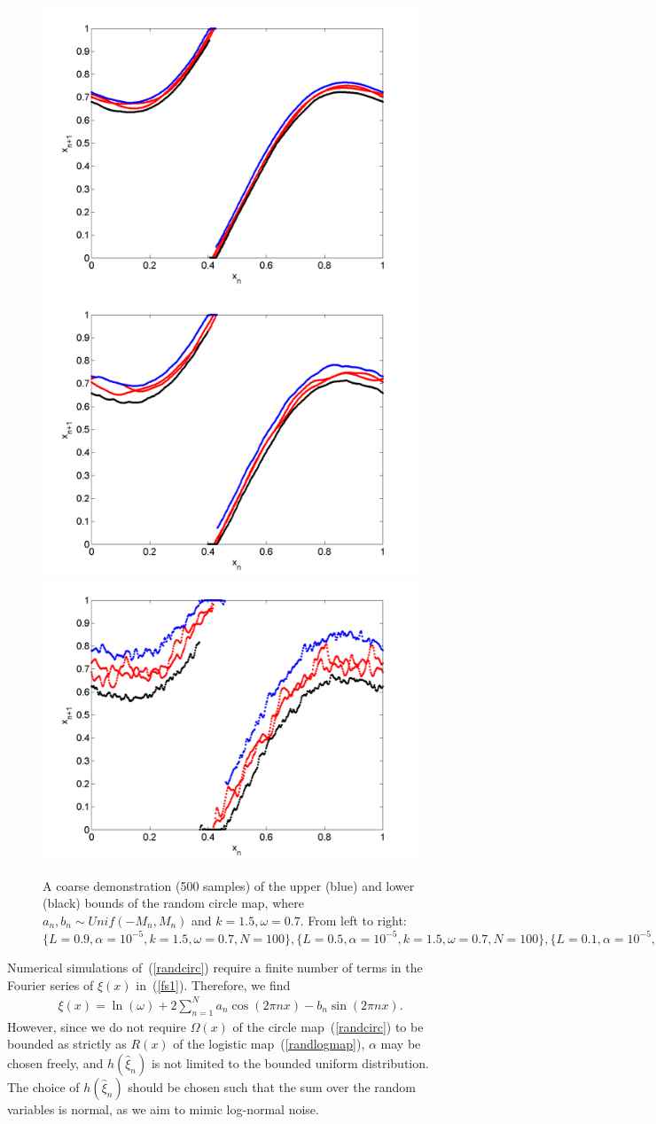 \begin{figure}[htp]
\caption[Upper and lower bounds on the random circle map, Uniform
distribution for $k=1.5,\omega=0.7$]{A coarse
  demonstration (500 samples) of the upper (blue) and lower (black)
  bounds of the random circle map, where $a_n,b_n\sim Unif(-M_n,M_n)$
  and $k=1.5,\omega=0.7$. From left to right:
  $\{L=0.9,\alpha = 10^{-5},k=1.5,\omega=0.7,N=100\}, \{L=0.5,\alpha = 10^{-5},k=1.5,\omega=0.7,N=100\},\{L=0.1,\alpha = 10^{-5},k=1.5,\omega=0.7,N=100\},$
  }\label{fig:circ_u_envelope3}
\centering
\includegraphics[width=.3\textwidth]{figs/envelope_unif_500_k15_L09_w07.png}\hfill
\includegraphics[width=.3\textwidth]{figs/envelope_unif_500_k15_L05_w07.png}\hfill
\includegraphics[width=.3\textwidth]{figs/envelope_unif_500_k15_L01_w07.png}
\end{figure}

Numerical simulations of~(\ref{randcirc}) require a finite number of
terms in the Fourier series of $\xi(x)$ in~(\ref{fs1}). Therefore, we find
\begin{align}\label{fs_circ}
\xi(x) = \ln(\omega) + 2\sum^N_{n=1}a_n\cos(2\pi nx)-b_n\sin(2\pi nx).
\end{align}
However, since we
do not require $\Omega(x)$ of the circle map~(\ref{randcirc}) to be bounded as strictly
as $R(x)$ of the logistic map~(\ref{randlogmap}), $\alpha$ may be
chosen freely, and $h(\hat{\xi}_n)$ is not limited to the bounded uniform
distribution. The choice of $h(\hat{\xi}_n)$ should be chosen such that the
sum over the random variables is normal, as we aim to mimic log-normal
noise.

